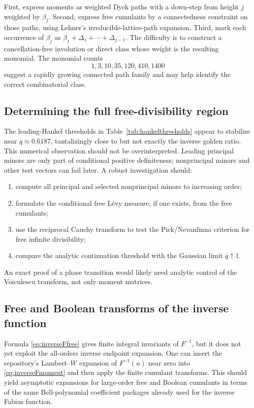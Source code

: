 \documentclass[11pt]{article}
\theoremstyle{definition}
\begin{document}
First, express moments as weighted Dyck paths with a down-step from height \(j\) weighted by \(\beta_j\). Second, express free cumulants by a connectedness constraint on those paths, using Lehner's irreducible-lattice-path expansion. Third, mark each occurrence of \(\beta_j\) as \(\beta_1+\Delta_1+\cdots+\Delta_{j-1}\). The difficulty is to construct a cancellation-free involution or direct class whose weight is the resulting monomial. The monomial counts
\[
1,3,10,35,120,410,1400
\]
suggest a rapidly growing connected path family and may help identify the correct combinatorial class.

\subsection{Determining the full free-divisibility region}
The leading-Hankel thresholds in Table~\ref{tab:hankelthresholds} appear to stabilize near \(q\approx0.6187\), tantalizingly close to but not exactly the inverse golden ratio. This numerical observation should not be overinterpreted. Leading principal minors are only part of conditional positive definiteness; nonprincipal minors and other test vectors can fail later. A robust investigation should:
\begin{enumerate}[label=(\alph*)]
\item compute all principal and selected nonprincipal minors to increasing order;
\item formulate the conditional free L\'evy measure, if one exists, from the free cumulants;
\item use the reciprocal Cauchy transform to test the Pick/Nevanlinna criterion for free infinite divisibility;
\item compare the analytic continuation threshold with the Gaussian limit \(q\uparrow1\).
\end{enumerate}
An exact proof of a phase transition would likely need analytic control of the Voiculescu transform, not only moment matrices.

\subsection{Free and Boolean transforms of the inverse function}
Formula \eqref{eq:inverseFfree} gives finite integral invariants of \(F^{-1}\), but it does not yet exploit the all-orders inverse endpoint expansion. One can insert the repository's Lambert--\(W\) expansion of \(F^{-1}(u)\) near zero into \eqref{eq:inverseFmoment} and then apply the finite cumulant transforms. This should yield asymptotic expansions for large-order free and Boolean cumulants in terms of the same Bell-polynomial coefficient packages already used for the inverse Fabius function.
\end{document}
